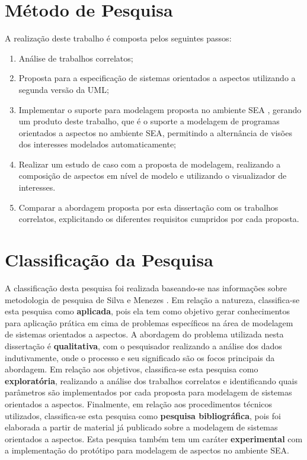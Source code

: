 \section{Método de Pesquisa}

A realização deste trabalho é composta pelos seguintes passos:

\begin{enumerate}
  \item Análise de trabalhos correlatos;
  \item Proposta para a especificação de sistemas orientados a aspectos utilizando a segunda versão da UML;
  \item Implementar o suporte para modelagem proposta no ambiente SEA \cite{silva:00}, gerando um produto deste trabalho, que é o suporte a
  modelagem de programas orientados a aspectos no ambiente SEA, permitindo a alternância de visões dos interesses modelados automaticamente;
  \item Realizar um estudo de caso com a proposta de modelagem, realizando a composição de aspectos em nível de modelo e utilizando o visualizador de
  interesses.
  \item Comparar a abordagem proposta por esta dissertação com os trabalhos correlatos, explicitando os diferentes requisitos cumpridos por cada
  proposta.
\end{enumerate}

\section{Classificação da Pesquisa}

A classificação desta pesquisa foi realizada baseando-se nas informações sobre metodologia de pesquisa de Silva e Menezes \cite{silva-menezes:01}. Em
relação a natureza, classifica-se esta pesquisa como \textbf{aplicada}, pois ela tem como objetivo gerar conhecimentos para aplicação prática em cima de
problemas específicos na área de modelagem de sistemas orientados a aspectos. A abordagem do problema utilizada nesta dissertação é
\textbf{qualitativa}, com o pesquisador realizando a análise dos dados indutivamente, onde o processo e seu significado são os
focos principais da abordagem. Em relação aos objetivos, classifica-se esta pesquisa como \textbf{exploratória}, realizando a análise dos trabalhos
correlatos e identificando quais parâmetros são implementados por cada proposta para modelagem de sistemas orientados a aspectos. Finalmente, em
relação aos procedimentos técnicos utilizados, classifica-se esta pesquisa como \textbf{pesquisa bibliográfica}, pois foi elaborada a partir de
material já publicado sobre a modelagem de sistemas orientados a aspectos. Esta pesquisa também tem um caráter \textbf{experimental} com a
implementação do protótipo para modelagem de aspectos no ambiente SEA.


